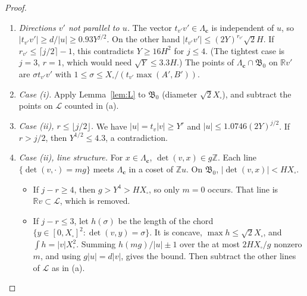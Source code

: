 \documentclass[11pt]{amsart}
\theoremstyle{definition}
\newcommand{\Z}{\mathbb{Z}}
\newcommand{\R}{\mathbb{R}}
\newcommand{\Xb}{X_{\square}}
\begin{document}
\begin{proof}
\begin{enumerate}[label=(\alph*)]
\item \emph{Directions $v'$ not parallel to $u$.} The vector $t_{v'}v'\in\Lambda_{\mathbf c}$ is
  independent of $u$, so $|t_{v'}v'|\ge d/|u|\ge0.93Y^{j/2}$. On the other hand
  $|t_{v'}v'|\le(2Y)^{r_{v'}}\sqrt2H$. If $r_{v'}\le\lceil j/2\rceil-1$, this contradicts
  $Y\ge16H^2$ for $j\le4$. (The tightest case is $j=3$, $r=1$, which would need
  $\sqrt Y\le3.3H$.) The points of $\Lambda_{\mathbf c}\cap\mathfrak B_0$ on $\R v'$ are
  $\sigma t_{v'}v'$ with $1\le\sigma\le\Xb/(t_{v'}\max(A',B'))$.
\item \emph{Case (i).} Apply Lemma~\ref{lem:L} to $\mathfrak B_0$ (diameter $\sqrt2\Xb$), and
  subtract the points on $\mathcal L$ counted in (a).
\item \emph{Case (ii), $r\le\lfloor j/2\rfloor$.} We have $|u|=t_v|v|\ge Y^r$ and
  $|u|\le1.0746(2Y)^{j/2}$. If $r>j/2$, then $Y^{1/2}\le4.3$, a contradiction.
\item \emph{Case (ii), line structure.} For $x\in\Lambda_{\mathbf c}$, $\det(v,x)\in g\Z$.
  Each line $\{\det(v,\cdot)=mg\}$ meets $\Lambda_{\mathbf c}$ in a coset of $\Z u$. On
  $\mathfrak B_0$, $|\det(v,x)|<H\Xb$.
  \begin{itemize}
  \item If $j-r\ge4$, then $g>Y^4>H\Xb$, so only $m=0$ occurs. That line is $\R v\subset\mathcal
    L$, which is removed.
  \item If $j-r\le3$, let $h(\sigma)$ be the length of the chord $\{y\in[0,\Xb]^2:\det(v,y)=\sigma\}$.
    It is concave, $\max h\le\sqrt2\Xb$, and $\int h=|v|\Xb^2$. Summing $h(mg)/|u|\pm1$ over the
    at most $2H\Xb/g$ nonzero $m$, and using $g|u|=d|v|$, gives the bound. Then subtract the
    other lines of $\mathcal L$ as in (a).
  \end{itemize}
\end{enumerate}
\end{proof}
\end{document}
